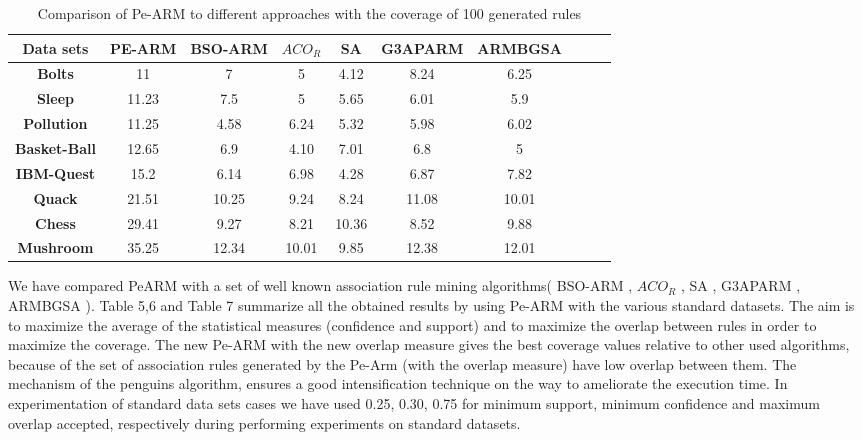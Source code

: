 \documentclass[preprint,12pt]{elsarticle}
\begin{document}
\begin{table}[htbp]
\small
\centering
\caption{Comparison of Pe-ARM to  different approaches with the coverage of 100 generated rules}
\begin{tabular}{c c c c c c c c c c}
\toprule
\textbf{Data sets} & PE-ARM& BSO-ARM & $ACO_{R}$ & SA & G3APARM & ARMBGSA \\
\midrule
\textbf{Bolts}&11&	7	& 5& 4.12 & 8.24 & 6.25 &\\\hline
\textbf{Sleep}&11.23& 7.5	& 5 & 5.65 & 6.01 & 5.9 &\\\hline
\textbf{Pollution}&11.25&	4.58 & 6.24 & 5.32 & 5.98 & 6.02 &\\\hline
\textbf{Basket-Ball}&12.65&	6.9 & 4.10 & 7.01 & 6.8 & 5 &\\\hline
\textbf{IBM-Quest}&15.2& 6.14	& 6.98 & 4.28 & 6.87 & 7.82 &\\\hline
\textbf{Quack}&21.51&	10.25	& 9.24 & 8.24 & 11.08 & 10.01 &\\\hline
\textbf{Chess}&29.41&	9.27	& 8.21 & 10.36 & 8.52 & 9.88 &\\\hline
\textbf{Mushroom}&35.25& 12.34	& 10.01 & 9.85 & 12.38 & 12.01 &\\\hline
\bottomrule
\end{tabular}
\end{table}
\newpage
We have compared PeARM with a set of well known association rule mining algorithms( BSO-ARM \cite{22} , $ACO_{R}$ \cite{13}, 
SA \cite{30}, G3APARM  \cite{11},  ARMBGSA \cite{21}).
Table 5,6 and Table 7 summarize all the obtained results by using Pe-ARM with the various standard datasets. 
The aim is to maximize the average of the statistical measures (confidence and support) and to maximize the overlap 
between rules in order to maximize the coverage.
The new Pe-ARM with the new overlap measure gives the best coverage values relative to other used algorithms, 
because of the set of association rules generated by the Pe-Arm (with the overlap measure) have low overlap between them. 
The mechanism of the penguins algorithm, ensures a good intensification technique on the way to ameliorate the execution time.
In experimentation of standard data sets cases we have used 0.25, 0.30, 0.75 for minimum support, minimum confidence and maximum overlap accepted, respectively during performing experiments on standard datasets. 
\end{document}
